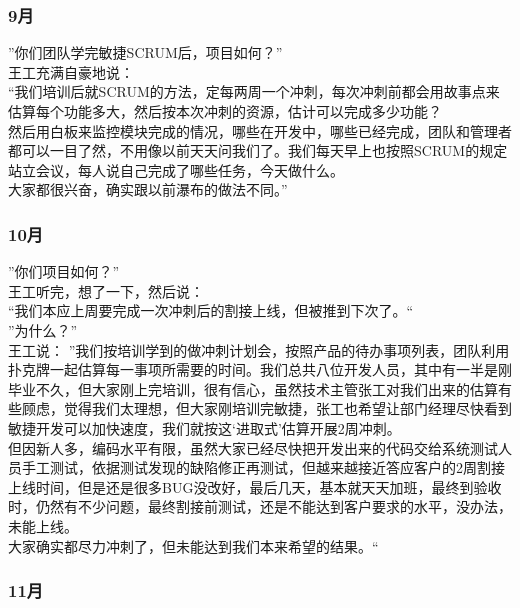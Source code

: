 \hypertarget{ux6708-2}{%
\subsubsection{9月}\label{ux6708-2}}

''你们团队学完敏捷SCRUM后，项目如何？''\\
王工充满自豪地说：\\
``我们培训后就SCRUM的方法，定每两周一个冲刺，每次冲刺前都会用故事点来估算每个功能多大，然后按本次冲刺的资源，估计可以完成多少功能？\\
然后用白板来监控模块完成的情况，哪些在开发中，哪些已经完成，团队和管理者都可以一目了然，不用像以前天天问我们了。我们每天早上也按照SCRUM的规定站立会议，每人说自己完成了哪些任务，今天做什么。\\
大家都很兴奋，确实跟以前瀑布的做法不同。''

\hypertarget{ux6708-3}{%
\subsubsection{10月}\label{ux6708-3}}

''你们项目如何？''\\
王工听完，想了一下，然后说：\\
``我们本应上周要完成一次冲刺后的割接上线，但被推到下次了。``\\
''为什么？''\\
王工说：
''我们按培训学到的做冲刺计划会，按照产品的待办事项列表，团队利用扑克牌一起估算每一事项所需要的时间。我们总共八位开发人员，其中有一半是刚毕业不久，但大家刚上完培训，很有信心，虽然技术主管张工对我们出来的估算有些顾虑，觉得我们太理想，但大家刚培训完敏捷，张工也希望让部门经理尽快看到敏捷开发可以加快速度，我们就按这`进取式'估算开展2周冲刺。\\
但因新人多，编码水平有限，虽然大家已经尽快把开发出来的代码交给系统测试人员手工测试，依据测试发现的缺陷修正再测试，但越来越接近答应客户的2周割接上线时间，但是还是很多BUG没改好，最后几天，基本就天天加班，最终到验收时，仍然有不少问题，最终割接前测试，还是不能达到客户要求的水平，没办法，未能上线。\\
大家确实都尽力冲刺了，但未能达到我们本来希望的结果。``

\hypertarget{ux6708-4}{%
\subsubsection{11月}\label{ux6708-4}}

